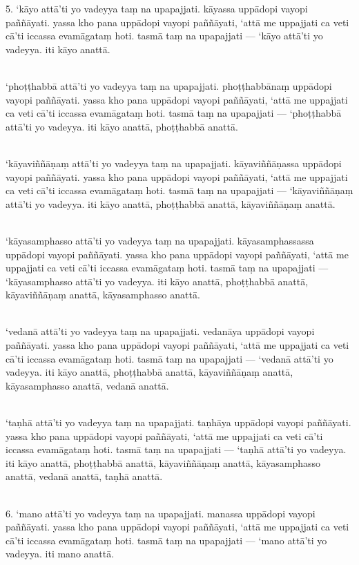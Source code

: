 \documentclass[9pt]{article}
\begin{document}
5. ‘kāyo attā’ti yo vadeyya taṃ na upapajjati. kāyassa uppādopi vayopi paññāyati. yassa kho pana uppādopi vayopi paññāyati, ‘attā me uppajjati ca veti cā’ti iccassa evamāgataṃ hoti. tasmā taṃ na upapajjati — ‘kāyo attā’ti yo vadeyya. iti kāyo anattā.\\\

‘phoṭṭhabbā attā’ti yo vadeyya taṃ na upapajjati. phoṭṭhabbānaṃ uppādopi vayopi paññāyati. yassa kho pana uppādopi vayopi paññāyati, ‘attā me uppajjati ca veti cā’ti iccassa evamāgataṃ hoti. tasmā taṃ na upapajjati — ‘phoṭṭhabbā attā’ti yo vadeyya. iti kāyo anattā, phoṭṭhabbā anattā.\\\

‘kāyaviññāṇaṃ attā’ti yo vadeyya taṃ na upapajjati. kāyaviññāṇassa uppādopi vayopi paññāyati. yassa kho pana uppādopi vayopi paññāyati, ‘attā me uppajjati ca veti cā’ti iccassa evamāgataṃ hoti. tasmā taṃ na upapajjati — ‘kāyaviññāṇaṃ attā’ti yo vadeyya. iti kāyo anattā, phoṭṭhabbā anattā, kāyaviññāṇaṃ anattā.\\\

‘kāyasamphasso attā’ti yo vadeyya taṃ na upapajjati. kāyasamphassassa uppādopi vayopi paññāyati. yassa kho pana uppādopi vayopi paññāyati, ‘attā me uppajjati ca veti cā’ti iccassa evamāgataṃ hoti. tasmā taṃ na upapajjati — ‘kāyasamphasso attā’ti yo vadeyya. iti kāyo anattā, phoṭṭhabbā anattā, kāyaviññāṇaṃ anattā, kāyasamphasso anattā.\\\

‘vedanā attā’ti yo vadeyya taṃ na upapajjati. vedanāya uppādopi vayopi paññāyati. yassa kho pana uppādopi vayopi paññāyati, ‘attā me uppajjati ca veti cā’ti iccassa evamāgataṃ hoti. tasmā taṃ na upapajjati — ‘vedanā attā’ti yo vadeyya. iti kāyo anattā, phoṭṭhabbā anattā, kāyaviññāṇaṃ anattā, kāyasamphasso anattā, vedanā anattā.\\\

‘taṇhā attā’ti yo vadeyya taṃ na upapajjati. taṇhāya uppādopi vayopi paññāyati. yassa kho pana uppādopi vayopi paññāyati, ‘attā me uppajjati ca veti cā’ti iccassa evamāgataṃ hoti. tasmā taṃ na upapajjati — ‘taṇhā attā’ti yo vadeyya. iti kāyo anattā, phoṭṭhabbā anattā, kāyaviññāṇaṃ anattā, kāyasamphasso anattā, vedanā anattā, taṇhā anattā.\\\

6. ‘mano attā’ti yo vadeyya taṃ na upapajjati. manassa uppādopi vayopi paññāyati. yassa kho pana uppādopi vayopi paññāyati, ‘attā me uppajjati ca veti cā’ti iccassa evamāgataṃ hoti. tasmā taṃ na upapajjati — ‘mano attā’ti yo vadeyya. iti mano anattā.\\\
\end{document}
